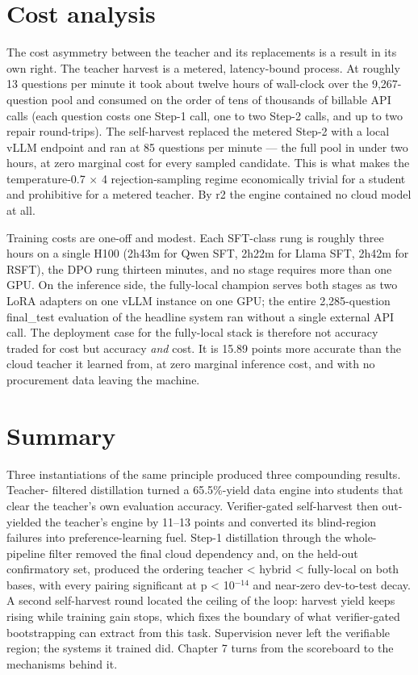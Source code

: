 \section{Cost analysis}\label{sec:cost-analysis}

The cost asymmetry between the teacher and its replacements is a result in its own right. The
teacher harvest is a metered, latency-bound process. At roughly 13 questions per minute it
took about twelve hours of wall-clock over the 9,267-question pool and consumed on the order
of tens of thousands of billable API calls (each question costs one Step-1 call, one to two
Step-2 calls, and up to two repair round-trips). The self-harvest replaced the metered Step-2
with a local vLLM endpoint and ran at 85 questions per minute --- the full pool in under two
hours, at zero marginal cost for every sampled candidate. This is what makes the
temperature-0.7 $\times$ 4 rejection-sampling regime economically trivial for a student and
prohibitive for a metered teacher. By r2 the engine contained no cloud model at all.

Training costs are one-off and modest. Each SFT-class rung is roughly three hours on a single
H100 (2h43m for Qwen SFT, 2h22m for Llama SFT, 2h42m for RSFT), the DPO rung thirteen minutes,
and no stage requires more than one GPU. On the inference side, the fully-local champion
serves both stages as two LoRA adapters on one vLLM instance on one GPU; the entire
2,285-question final\_test evaluation of the headline system ran without a single external API
call. The deployment case for the fully-local stack is therefore not accuracy traded for cost
but accuracy \emph{and} cost. It is 15.89 points more accurate than the cloud teacher it learned
from, at zero marginal inference cost, and with no procurement data leaving the machine.

\section{Summary}\label{sec:summary}

Three instantiations of the same principle produced three compounding results. Teacher-
filtered distillation turned a 65.5\%-yield data engine into students that clear the teacher's
own evaluation accuracy. Verifier-gated self-harvest then out-yielded the teacher's engine by
11--13 points and converted its blind-region failures into preference-learning fuel. Step-1
distillation through the whole-pipeline filter removed the final cloud dependency and, on the
held-out confirmatory set, produced the ordering teacher < hybrid < fully-local on both bases,
with every pairing significant at p < 10$^{-14}$ and near-zero dev-to-test decay. A second
self-harvest round located the ceiling of the loop: harvest yield keeps rising while training
gain stops, which fixes the boundary of what verifier-gated bootstrapping can extract from
this task. Supervision never left the verifiable region; the systems it trained did. Chapter 7
turns from the scoreboard to the mechanisms behind it.

